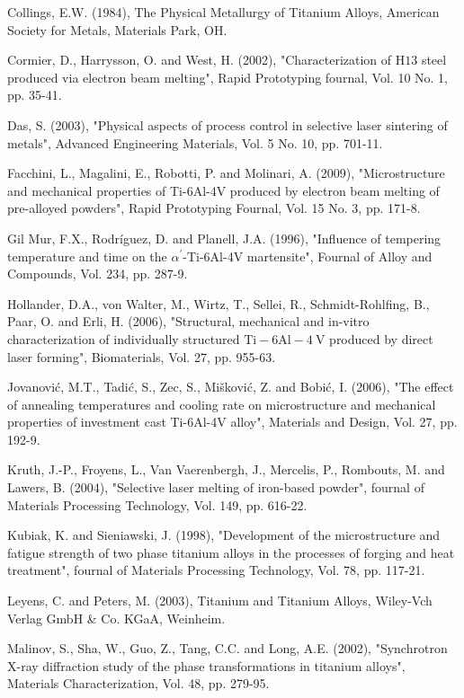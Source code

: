 \documentclass[10pt]{article}
\begin{document}
Collings, E.W. (1984), The Physical Metallurgy of Titanium Alloys, American Society for Metals, Materials Park, OH.

Cormier, D., Harrysson, O. and West, H. (2002), "Characterization of $\mathrm{H} 13$ steel produced via electron beam melting", Rapid Prototyping fournal, Vol. 10 No. 1, pp. 35-41.

Das, S. (2003), "Physical aspects of process control in selective laser sintering of metals", Advanced Engineering Materials, Vol. 5 No. 10, pp. 701-11.

Facchini, L., Magalini, E., Robotti, P. and Molinari, A. (2009), "Microstructure and mechanical properties of Ti-6Al-4V produced by electron beam melting of pre-alloyed powders", Rapid Prototyping Fournal, Vol. 15 No. 3, pp. 171-8.

Gil Mur, F.X., Rodríguez, D. and Planell, J.A. (1996), "Influence of tempering temperature and time on the $\alpha^{\prime}$-Ti-6Al-4V martensite", Fournal of Alloy and Compounds, Vol. 234, pp. 287-9.

Hollander, D.A., von Walter, M., Wirtz, T., Sellei, R., Schmidt-Rohlfing, B., Paar, O. and Erli, H. (2006), "Structural, mechanical and in-vitro characterization of individually structured $\mathrm{Ti}-6 \mathrm{Al}-4 \mathrm{~V}$ produced by direct laser forming", Biomaterials, Vol. 27, pp. 955-63.

Jovanović, M.T., Tadić, S., Zec, S., Mišković, Z. and Bobić, I. (2006), "The effect of annealing temperatures and cooling rate on microstructure and mechanical properties of investment cast Ti-6Al-4V alloy", Materials and Design, Vol. 27, pp. 192-9.

Kruth, J.-P., Froyens, L., Van Vaerenbergh, J., Mercelis, P., Rombouts, M. and Lawers, B. (2004), "Selective laser melting of iron-based powder", fournal of Materials Processing Technology, Vol. 149, pp. 616-22.

Kubiak, K. and Sieniawski, J. (1998), "Development of the microstructure and fatigue strength of two phase titanium alloys in the processes of forging and heat treatment", fournal of Materials Processing Technology, Vol. 78, pp. 117-21.

Leyens, C. and Peters, M. (2003), Titanium and Titanium Alloys, Wiley-Vch Verlag GmbH \& Co. KGaA, Weinheim.

Malinov, S., Sha, W., Guo, Z., Tang, C.C. and Long, A.E. (2002), "Synchrotron X-ray diffraction study of the phase transformations in titanium alloys", Materials Characterization, Vol. 48, pp. 279-95.
\end{document}
